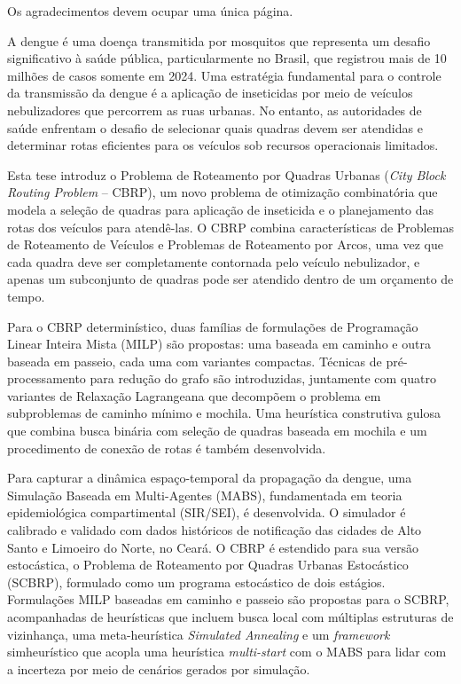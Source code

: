 \documentclass[Ingles]{ic-tese-v3}
\begin{document}
Os agradecimentos devem ocupar uma única página.


\begin{resumo}
	A dengue é uma doença transmitida por mosquitos que representa um desafio
	significativo à saúde pública, particularmente no Brasil, que registrou mais de
	10 milhões de casos somente em 2024. Uma estratégia fundamental para o controle
	da transmissão da dengue é a aplicação de inseticidas por meio de veículos
	nebulizadores que percorrem as ruas urbanas. No entanto, as autoridades de saúde
	enfrentam o desafio de selecionar quais quadras devem ser atendidas e determinar
	rotas eficientes para os veículos sob recursos operacionais limitados.

	Esta tese introduz o Problema de Roteamento por Quadras Urbanas (\textit{City
	Block Routing Problem} -- CBRP), um novo problema de otimização combinatória que
	modela a seleção de quadras para aplicação de inseticida e o planejamento das
	rotas dos veículos para atendê-las. O CBRP combina características de Problemas
	de Roteamento de Veículos e Problemas de Roteamento por Arcos, uma vez que cada
	quadra deve ser completamente contornada pelo veículo nebulizador, e apenas um
	subconjunto de quadras pode ser atendido dentro de um orçamento de tempo.

	Para o CBRP determinístico, duas famílias de formulações de Programação Linear
	Inteira Mista (MILP) são propostas: uma baseada em caminho e outra baseada em
	passeio, cada uma com variantes compactas. Técnicas de pré-processamento para
	redução do grafo são introduzidas, juntamente com quatro variantes de Relaxação
	Lagrangeana que decompõem o problema em subproblemas de caminho mínimo e
	mochila. Uma heurística construtiva gulosa que combina busca binária com seleção
	de quadras baseada em mochila e um procedimento de conexão de rotas é também
	desenvolvida.

	Para capturar a dinâmica espaço-temporal da propagação da dengue, uma Simulação
	Baseada em Multi-Agentes (MABS), fundamentada em teoria epidemiológica
	compartimental (SIR/SEI), é desenvolvida. O simulador é calibrado e validado com
	dados históricos de notificação das cidades de Alto Santo e Limoeiro do Norte,
	no Ceará. O CBRP é estendido para sua versão estocástica, o Problema de
	Roteamento por Quadras Urbanas Estocástico (SCBRP), formulado como um programa
	estocástico de dois estágios. Formulações MILP baseadas em caminho e passeio são
	propostas para o SCBRP, acompanhadas de heurísticas que incluem busca local com
	múltiplas estruturas de vizinhança, uma meta-heurística \textit{Simulated
	Annealing} e um \textit{framework} simheurístico que acopla uma heurística
	\textit{multi-start} com o MABS para lidar com a incerteza por meio de cenários
	gerados por simulação.


\end{resumo}
\end{document}
